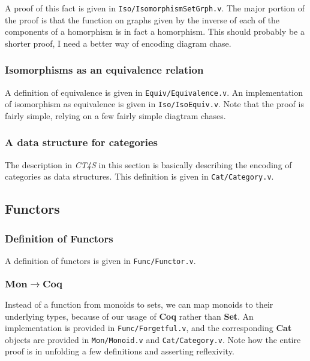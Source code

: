 \documentclass[12pt,twocolumn,oneside]{book}
\begin{document}
A proof of this fact is given in \texttt{Iso/IsomorphismSetGrph.v}. The major portion of the
proof is that the function on graphs given by the inverse of each of the components
of a homorphism is in fact a homorphism. This should probably be a shorter proof,
I need a better way of encoding diagram chase.

\subsubsection{Isomorphisms as an equivalence relation}

A definition of equivalence is given in \texttt{Equiv/Equivalence.v}. An implementation
of isomorphism as equivalence is given in \texttt{Iso/IsoEquiv.v}. Note that the proof
is fairly simple, relying on a few fairly simple diagtram chases.

\subsubsection{A data structure for categories}

The description in \emph{CT4S} in this section is basically describing the encoding
of categories as data structures. This definition is given in \texttt{Cat/Category.v}.

\subsection{Functors}

\subsubsection{Definition of Functors}

A definition of functors is given in \texttt{Func/Functor.v}.

\subsubsection{$\mathbf{Mon} \to \mathbf{Coq}$}

Instead of a function from monoids to sets, we can map monoids to their underlying types, because
of our usage of \textbf{Coq} rather than \textbf{Set}. An implementation is provided
in \texttt{Func/Forgetful.v}, and the corresponding \textbf{Cat} objects are provided in \texttt{Mon/Monoid.v}
and \texttt{Cat/Category.v}. Note how the entire proof is in unfolding a few definitions and
asserting reflexivity.
\end{document}
